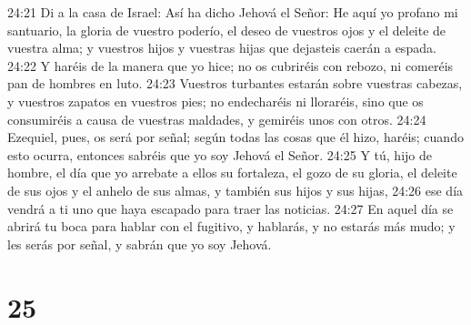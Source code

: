 24:21 Di a la casa de Israel: Así ha dicho Jehová el Señor: He aquí yo profano mi santuario, la gloria de vuestro poderío, el deseo de vuestros ojos y el deleite de vuestra alma; y vuestros hijos y vuestras hijas que dejasteis caerán a espada.  
24:22 Y haréis de la manera que yo hice; no os cubriréis con rebozo, ni comeréis pan de hombres en luto.  
24:23 Vuestros turbantes estarán sobre vuestras cabezas, y vuestros zapatos en vuestros pies; no endecharéis ni lloraréis, sino que os consumiréis a causa de vuestras maldades, y gemiréis unos con otros.  
24:24 Ezequiel, pues, os será por señal; según todas las cosas que él hizo, haréis; cuando esto ocurra, entonces sabréis que yo soy Jehová el Señor.  
24:25 Y tú, hijo de hombre, el día que yo arrebate a ellos su fortaleza, el gozo de su gloria, el deleite de sus ojos y el anhelo de sus almas, y también sus hijos y sus hijas,  
24:26 ese día vendrá a ti uno que haya escapado para traer las noticias.  
24:27 En aquel día se abrirá tu boca para hablar con el fugitivo, y hablarás, y no estarás más mudo; y les serás por señal, y sabrán que yo soy Jehová.  

\chapter{25}

